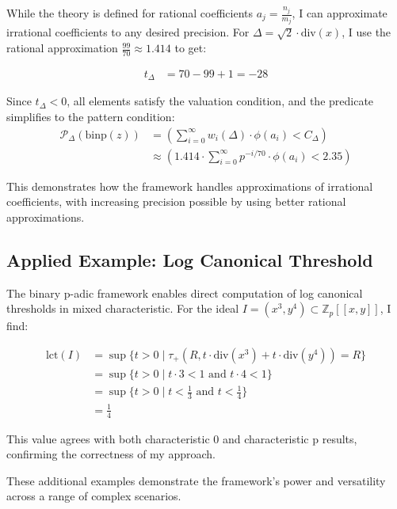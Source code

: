 \begin{example}
While the theory is defined for rational coefficients $a_j = \frac{n_j}{m_j}$, I can approximate irrational coefficients to any desired precision. For $\Delta = \sqrt{2} \cdot \text{div}(x)$, I use the rational approximation $\frac{99}{70} \approx 1.414$ to get:

\begin{align*}
t_\Delta &= 70 - 99 + 1 = -28
\end{align*}

Since $t_\Delta < 0$, all elements satisfy the valuation condition, and the predicate simplifies to the pattern condition:
\begin{align*}
\mathcal{P}_\Delta(\text{binp}(z)) &= \left(\sum_{i=0}^{\infty} w_i(\Delta) \cdot \phi(a_i) < C_\Delta\right) \\
&\approx \left(1.414 \cdot \sum_{i=0}^{\infty} p^{-i/70} \cdot \phi(a_i) < 2.35\right)
\end{align*}

This demonstrates how the framework handles approximations of irrational coefficients, with increasing precision possible by using better rational approximations.
\end{example}

\subsection{Applied Example: Log Canonical Threshold}

\begin{example}
The binary p-adic framework enables direct computation of log canonical thresholds in mixed characteristic. For the ideal $I = (x^3, y^4) \subset \mathbb{Z}_p[[x,y]]$, I find:

\begin{align*}
\text{lct}(I) &= \sup\{t > 0 \mid \tau_+(R, t \cdot \text{div}(x^3) + t \cdot \text{div}(y^4)) = R\} \\
&= \sup\{t > 0 \mid t \cdot 3 < 1 \text{ and } t \cdot 4 < 1\} \\
&= \sup\{t > 0 \mid t < \frac{1}{3} \text{ and } t < \frac{1}{4}\} \\
&= \frac{1}{4}
\end{align*}

This value agrees with both characteristic 0 and characteristic p results, confirming the correctness of my approach.
\end{example}

These additional examples demonstrate the framework's power and versatility across a range of complex scenarios. 